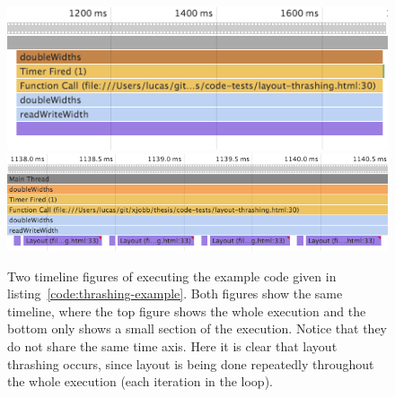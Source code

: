 \documentclass[a4paper,11pt]{kth-mag}
\begin{document}
        \begin{figure}[h]
          \centering
          \includegraphics[scale=0.5]{images/layout-thrashing-example-1-big}
          \includegraphics[scale=0.5]{images/layout-thrashing-example-1}
          \caption{Two timeline figures of executing the example code given in listing~\ref{code:thrashing-example}. Both figures show the same timeline, where the top figure shows the whole execution and the bottom only shows a small section of the execution. Notice that they do not share the same time axis. Here it is clear that layout thrashing occurs, since layout is being done repeatedly throughout the whole execution (each iteration in the loop).}
          \label{fig:layout-thrashing-example-1}
        \end{figure}
        
\end{document}
